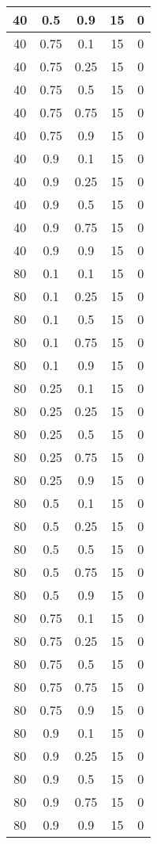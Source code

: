 \documentclass{bmstu}
\begin{document}
\begin{center}
\begin{longtable}[c]{|c|c|c|c|c|}
40 & 0.5 & 0.9 & 15 & 0 \\\hline
40 & 0.75 & 0.1 & 15 & 0 \\\hline
40 & 0.75 & 0.25 & 15 & 0 \\\hline
40 & 0.75 & 0.5 & 15 & 0 \\\hline
40 & 0.75 & 0.75 & 15 & 0 \\\hline
40 & 0.75 & 0.9 & 15 & 0 \\\hline
40 & 0.9 & 0.1 & 15 & 0 \\\hline
40 & 0.9 & 0.25 & 15 & 0 \\\hline
40 & 0.9 & 0.5 & 15 & 0 \\\hline
40 & 0.9 & 0.75 & 15 & 0 \\\hline
40 & 0.9 & 0.9 & 15 & 0 \\\hline
80 & 0.1 & 0.1 & 15 & 0 \\\hline
80 & 0.1 & 0.25 & 15 & 0 \\\hline
80 & 0.1 & 0.5 & 15 & 0 \\\hline
80 & 0.1 & 0.75 & 15 & 0 \\\hline
80 & 0.1 & 0.9 & 15 & 0 \\\hline
80 & 0.25 & 0.1 & 15 & 0 \\\hline
80 & 0.25 & 0.25 & 15 & 0 \\\hline
80 & 0.25 & 0.5 & 15 & 0 \\\hline
80 & 0.25 & 0.75 & 15 & 0 \\\hline
80 & 0.25 & 0.9 & 15 & 0 \\\hline
80 & 0.5 & 0.1 & 15 & 0 \\\hline
80 & 0.5 & 0.25 & 15 & 0 \\\hline
80 & 0.5 & 0.5 & 15 & 0 \\\hline
80 & 0.5 & 0.75 & 15 & 0 \\\hline
80 & 0.5 & 0.9 & 15 & 0 \\\hline
80 & 0.75 & 0.1 & 15 & 0 \\\hline
80 & 0.75 & 0.25 & 15 & 0 \\\hline
80 & 0.75 & 0.5 & 15 & 0 \\\hline
80 & 0.75 & 0.75 & 15 & 0 \\\hline
80 & 0.75 & 0.9 & 15 & 0 \\\hline
80 & 0.9 & 0.1 & 15 & 0 \\\hline
80 & 0.9 & 0.25 & 15 & 0 \\\hline
80 & 0.9 & 0.5 & 15 & 0 \\\hline
80 & 0.9 & 0.75 & 15 & 0 \\\hline
80 & 0.9 & 0.9 & 15 & 0 \\\hline

\end{longtable}
\end{center}
\end{document}

